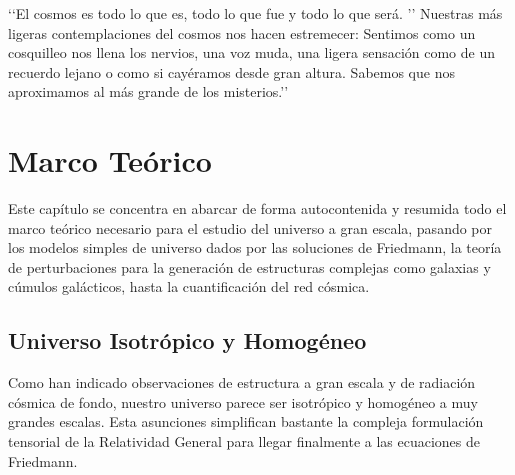 


\begin{savequote}[50mm]
‘‘El cosmos es todo lo que es, todo lo que fue y todo lo que será. ’’
Nuestras 
más ligeras contemplaciones del cosmos nos hacen estremecer: Sentimos como 
un cosquilleo nos llena los nervios, una voz muda, una ligera sensación como
de un recuerdo lejano o como si cayéramos desde gran altura. Sabemos que nos
aproximamos al más grande de los misterios.’’
\end{savequote}

\chapter{Marco Teórico}
\label{cha:Theoretical Framework}

\ifpdf
    \graphicspath{{2_state_of_the_art/figures/PNG/}{2_state_of_the_art/figures/PDF/}{2_state_of_the_art/figures/}}
\else
    \graphicspath{{2_state_of_the_art/figures/EPS/}{2_state_of_the_art/figures/}}
\fi


Este capítulo se concentra en abarcar de forma autocontenida y resumida 
todo el marco teórico necesario para el estudio del universo a gran escala,
pasando por los modelos simples de universo dados por las soluciones de 
Friedmann, la teoría de perturbaciones para la generación de estructuras
complejas como galaxias y cúmulos galácticos, hasta la cuantificación del 
red cósmica.


\section{Universo Isotrópico y Homogéneo}
\label{sec:IsotropicAndHomogeneousUniverse}


Como han indicado observaciones de estructura a gran escala y de radiación
cósmica de fondo, nuestro universo parece ser isotrópico y homogéneo a muy
grandes escalas. Esta asunciones simplifican bastante la compleja formulación
tensorial de la Relatividad General para llegar finalmente a las ecuaciones
de Friedmann.


